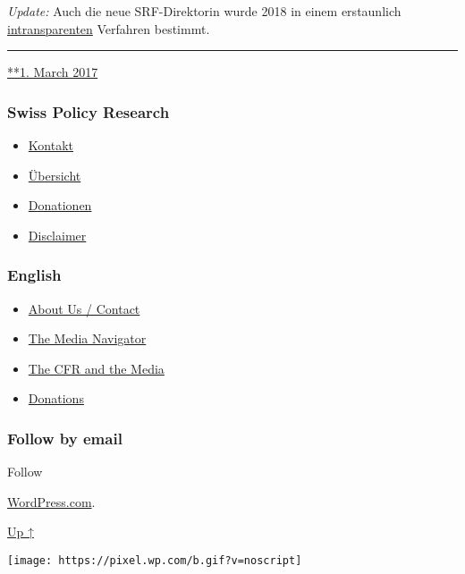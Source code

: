 \emph{Update:} Auch die neue SRF-Direktorin wurde 2018 in einem
erstaunlich
\href{http://www.kleinreport.ch/news/geheimloge-srg-intransparenz-bei-der-besetzung-der-srf-direktion-91015/}{intransparenten}
Ver­fah­ren bestimmt.

\begin{center}\rule{0.5\linewidth}{\linethickness}\end{center}

\href{https://swprs.org/2017/03/01/srg-idee-suisse/}{**1. March 2017}

\hypertarget{swiss-policy-research}{%
\subsubsection{Swiss Policy Research}\label{swiss-policy-research}}

\begin{itemize}
\tightlist
\item
  \href{https://swprs.org/kontakt/}{Kontakt}
\item
  \href{https://swprs.org/uebersicht/}{Übersicht}
\item
  \href{https://swprs.org/donationen/}{Donationen}
\item
  \href{https://swprs.org/disclaimer/}{Disclaimer}
\end{itemize}

\hypertarget{english}{%
\subsubsection{English}\label{english}}

\begin{itemize}
\tightlist
\item
  \href{https://swprs.org/contact/}{About Us / Contact}
\item
  \href{https://swprs.org/media-navigator/}{The Media Navigator}
\item
  \href{https://swprs.org/the-american-empire-and-its-media/}{The CFR
  and the Media}
\item
  \href{https://swprs.org/donations/}{Donations}
\end{itemize}

\hypertarget{follow-by-email}{%
\subsubsection{Follow by email}\label{follow-by-email}}

Follow

\href{https://wordpress.com/?ref=footer_custom_com}{WordPress.com}.

\protect\hyperlink{}{Up ↑}

\texttt{[image: https://pixel.wp.com/b.gif?v=noscript]}
